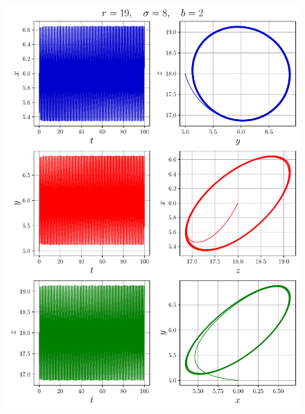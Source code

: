 \documentclass[12pt,a4paper]{article}
\begin{document}
	\begin{figure}
		\centering
		\includegraphics{fig/lorenz3}
	\end{figure}
\end{document}
